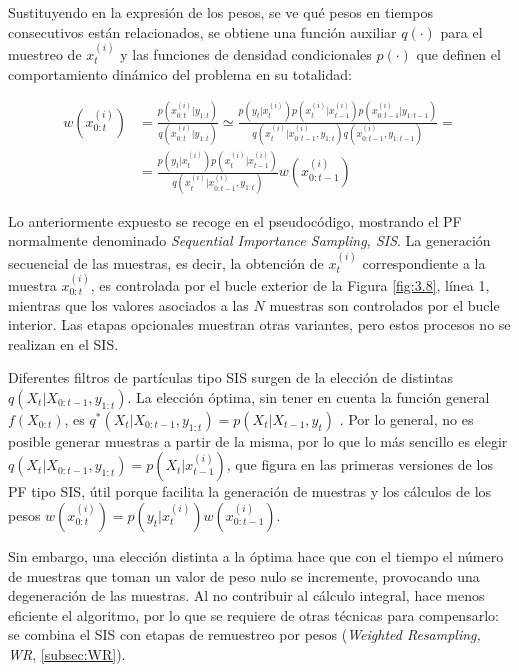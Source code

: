 Sustituyendo en la expresión de los pesos, se ve qué pesos en tiempos consecutivos están relacionados, se obtiene una función auxiliar $q(\cdot)$ para el muestreo de $x_{t}^{(i)}$ y las funciones de densidad condicionales $p(\cdot)$ que definen el comportamiento dinámico del problema en su totalidad:

\begin{equation}
    \begin{aligned}
        w(x_{0:t}^{(i)}) &= \frac{p\left(x_{0:t}^{(i)}|y_{1:t}\right)}{q\left(x_{0:t}^{(i)}|y_{1:t}\right)} \simeq \frac{p\left(y_{t}|x_{t}^{(i)}\right)p\left(x_{t}^{(i)}|x_{t-1}^{(i)}\right)p\left(x_{0:t-1}^{(i)}|y_{1:t-1}\right)}{q\left(x_{t}^{(i)}|x_{0:t-1}^{(i)},y_{1:t}\right)q\left(x_{0:t-1}^{(i)},y_{1:t-1}\right)} = \\
        &= \frac{p\left(y_{t}|x_{t}^{(i)}\right)p\left(x_{t}^{(i)}|x_{t-1}^{(i)}\right)}{q\left(x_{t}^{(i)}|x_{0:t-1}^{(i)},y_{1:t}\right)}w\left(x_{0:t-1}^{(i)}\right)
    \end{aligned}
    \label{ec:3.11}
\end{equation}

Lo anteriormente expuesto se recoge en el pseudocódigo, mostrando el PF normalmente denominado \textit{Sequential
Importance Sampling, SIS}. La generación secuencial de las muestras, es decir, la obtención de $x_t^{(i)}$ correspondiente a la muestra $x_{0:t}^{(i)}$, es controlada por el bucle exterior de la Figura \ref{fig:3.8}, línea 1, mientras que los valores asociados a las $N$ muestras son controlados por el bucle interior. Las etapas opcionales muestran otras variantes, pero estos procesos no se realizan en el SIS.

Diferentes filtros de partículas tipo SIS surgen de la elección de distintas $q\left(X_{t}|X_{0:t-1},y_{1:t}\right)$. La elección óptima, sin tener en cuenta la función general $f\left(X_{0:t}\right)$, es $q^*\left(X_{t}|X_{0:t-1},y_{1:t}\right) = p\left(X_t|X_{t-1},y_t\right)$ \cite{pajares2010aprendizaje}. Por lo general, no es posible generar muestras a partir de la misma, por lo que lo más sencillo es elegir $q\left(X_{t}|X_{0:t-1},y_{1:t}\right) = p\left(X_t|x_{t-1}^{(i)}\right)$, que figura en las primeras versiones de los PF tipo SIS, útil porque facilita la generación de muestras y los cálculos de los pesos $w\left(x_{0:t}^{(i)}\right) = p\left(y_t|x_t^{(i)}\right)w\left(x_{0:t-1}^{(i)}\right)$.

Sin embargo, una elección distinta a la óptima hace que con el tiempo el número de muestras que toman un valor de peso nulo se incremente, provocando una degeneración de las muestras. Al no contribuir al cálculo integral, hace menos eficiente el algoritmo, por lo que se requiere de otras técnicas para compensarlo: se combina el SIS con etapas de remuestreo por pesos (\textit{Weighted Resampling, WR}, \ref{subsec:WR}).

